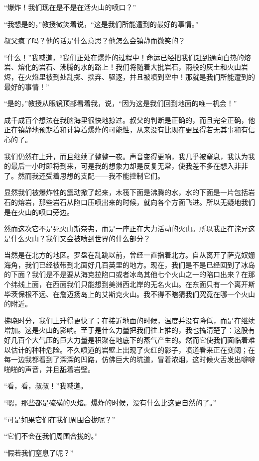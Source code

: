 \documentclass[10pt]{book}
\begin{document}
“爆炸！我们现在是不是在活火山的喷口？”

“我想是的，”教授微笑着说，“这是我们所能遭到的最好的事情。”

叔父疯了吗？他的话是什么意思？他怎么会镇静而微笑的？

“什么！”我喊道，“我们正处在爆炸的过程中！命运已经把我们赶到通向白热的熔岩、熔化的岩石、沸腾的水的路上！我们将随着大批岩石，雨般的灰土和火山岩烬，在火焰里被到处乱掷、摈弃、驱逐，并且被喷到空中！那就是我们所能遭到的最好的事情！”

“是的，”教授从眼镜顶部看着我，说，“因为这是我们回到地面的唯一机会！”

成千成百个想法在我脑海里很快地掠过。叔父的判断是正确的，而且完全正确，他正在镇静地预期着和计算着爆炸的可能性，从来没有比现在更显得若无其事和有信心的了。

我们仍然在上升，而且继续了整整一夜。声音变得更响，我几乎被窒息，我认为我的最后一小时即将到来，可是我的想象力却是反复无常，使我差不多在想入非非了。然而我还受着思想的支配——我不能控制它们。

显然我们被爆炸性的震动掀了起来，木筏下面是沸腾的水，水的下面是一片包括岩石的熔岩，那些岩石从陷口压喷出来的时候，就向各个方面飞进。所以无疑地我们是在火山的喷口旁边。

然而这次它不是死火山斯奈弗，而是一座正在大力活动的火山。所以我正在诧异这是什么火山？我们又会被喷到世界的什么部分？

当然是在北方的地区。罗盘在乱跳以前，曾经一直指着北方。自从离开了萨克奴姗海角，我们已经被带到北面好几百英里的地方。现在，我们是不是已经回到了冰岛的下面？我们是不是要从海克拉陷口或者冰岛其他七个火山之一的陷口出来？在那个纬线上面，在西面我们只能想到美洲西北岸的无名火山。在东面只有一个离开斯毕茨保根不远、在詹迈扬岛上的艾斯克火山。我不得不瞎猜我们究竟在哪一个火山的附近。

拂晓时分，我们上升得更快了；在接近地面的时候，温度并没有降低，而是在继续增加。这是火山的影响。至于是什么力量把我们往上推的，我也搞清楚了：这股有好几百个大气压的巨大力量是积聚在地底下的蒸气产生的。然而它使我们面临着难以估计的种种危险。不久喷道的岩壁上出现了火红的影子，喷道看来正在变阔；在每一边我都看到了深深的凹路，仿佛巨大的坑道，冒着浓烟，这时候火舌发出噼噼啪啪的声音，并且舐着岩壁。

“看，看，叔叔！”我喊道。

“嗯，那些都是硫磺的火焰。爆炸的时候，没有什么比这更自然的了。”

“可是如果它们在我们周围合拢呢？”

“它们不会在我们周围合拢的。”

“假若我们窒息了呢？”
\end{document}
